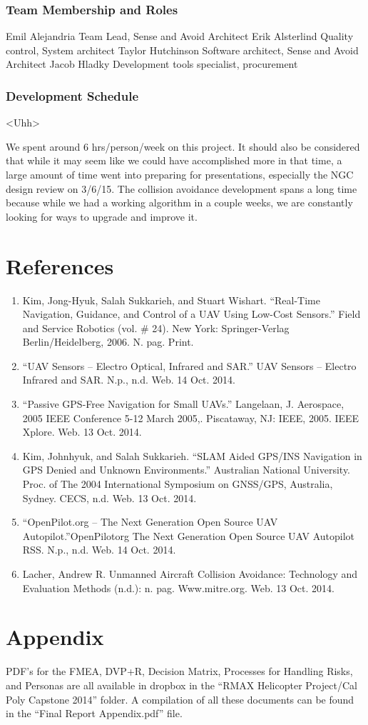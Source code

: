 \documentclass[12pt]{article}
\begin{document}
\subsubsection{Team Membership and Roles}
Emil Alejandria                 	Team Lead, Sense and Avoid Architect
Erik Alsterlind                   	Quality control, System architect
Taylor Hutchinson           	Software architect, Sense and Avoid Architect
Jacob Hladky                    	Development tools specialist, procurement

\subsubsection{Development Schedule}

<Uhh>

	We spent around 6 hrs/person/week on this project. It should also be considered that while it may seem like we could have accomplished more in that time, a large amount of time went into preparing for presentations, especially the NGC design review on 3/6/15. The collision avoidance development spans a long time because while we had a working algorithm in a couple weeks, we are constantly looking for ways to upgrade and improve it.

\section{References}
\begin{enumerate}
\item Kim, Jong-Hyuk, Salah Sukkarieh, and Stuart Wishart. ``Real-Time Navigation, Guidance, and Control of a UAV Using Low-Cost Sensors.'' Field and Service Robotics (vol. \# 24). New York: Springer-Verlag Berlin/Heidelberg, 2006. N. pag. Print.
\item ``UAV Sensors -- Electro Optical, Infrared and SAR.'' UAV Sensors -- Electro Infrared and SAR. N.p., n.d. Web. 14 Oct. 2014.
\item ``Passive GPS-Free Navigation for Small UAVs.'' Langelaan, J. Aerospace, 2005 IEEE Conference 5-12 March 2005,. Piscataway, NJ: IEEE, 2005. IEEE Xplore. Web. 13 Oct. 2014.
\item Kim, Johnhyuk, and Salah Sukkarieh. ``SLAM Aided GPS/INS Navigation in GPS Denied and Unknown Environments.'' Australian National University. Proc. of The 2004 International Symposium on GNSS/GPS, Australia, Sydney. CECS, n.d. Web. 13 Oct. 2014.
\item ``OpenPilot.org -- The Next Generation Open Source UAV Autopilot.''OpenPilotorg The Next Generation Open Source UAV Autopilot RSS. N.p., n.d. Web. 14 Oct. 2014.
\item Lacher, Andrew R. Unmanned Aircraft Collision Avoidance: Technology and Evaluation Methods (n.d.): n. pag. Www.mitre.org. Web. 13 Oct. 2014.
\end{enumerate}

\section{Appendix}
PDF's for the FMEA, DVP+R, Decision Matrix, Processes for Handling Risks, and Personas are all available in dropbox in the ``RMAX Helicopter Project/Cal Poly Capstone 2014'' folder. A compilation of all these documents can be found in the ``Final Report Appendix.pdf'' file.
\end{document}
